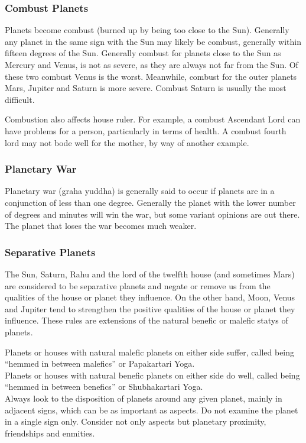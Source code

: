  

\subsubsection{Combust Planets}

Planets become combust (burned up by being too close to the Sun). Generally any planet in the same sign with the Sun may likely be combust, generally within fifteen degrees of the Sun.  Generally combust for planets close to the Sun as Mercury and Venus, is not as severe, as they are always not far from the Sun. Of these two combust Venus is the worst. Meanwhile, combust for the outer planets Mars, Jupiter and Saturn is more severe. Combust Saturn is usually the most difficult.

Combustion also affects house ruler. For example, a combust Ascendant Lord can have problems for a person, particularly in terms of health. A combust fourth lord may not bode well for the mother, by way of another example.

 

\subsubsection{Planetary War}

Planetary war (graha yuddha) is generally said to occur if planets are in a conjunction of less than one degree. Generally the planet with the lower number of degrees and minutes will win the war, but some variant opinions are out there. The planet that loses the war becomes much weaker.

 

\subsubsection{Separative Planets}

The Sun, Saturn, Rahu and the lord of the twelfth house (and sometimes Mars) are considered to be separative planets and negate or remove us from the qualities of the house or planet they influence. On the other hand, Moon, Venus and Jupiter tend to strengthen the positive qualities of the house or planet they influence. These rules are extensions of the natural benefic or malefic statys of planets.

Planets or houses with natural malefic planets on either side suffer, called being “hemmed in between malefics” or Papakartari Yoga.\\
Planets or houses with natural benefic planets on either side do well, called being “hemmed in between benefics” or Shubhakartari Yoga.\\
Always look to the disposition of planets around any given planet, mainly in adjacent signs, which can be as important as aspects. Do not examine the planet in a single sign only. Consider not only aspects but planetary proximity, friendships and enmities.

